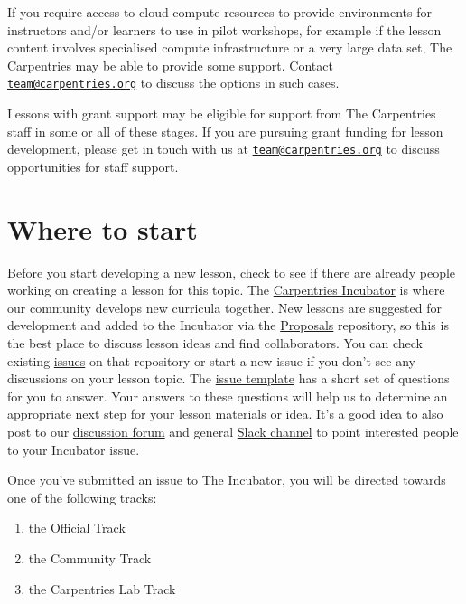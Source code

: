 \documentclass[
]{book}
\providecommand{\tightlist}{%
  \setlength{\itemsep}{0pt}\setlength{\parskip}{0pt}}
\begin{document}
If you require access to cloud compute resources to provide
environments for instructors and/or learners to use in pilot workshops,
for example if the lesson content involves specialised compute infrastructure
or a very large data set,
The Carpentries may be able to provide some support.
Contact \href{mailto:team@carpentries.org}{\nolinkurl{team@carpentries.org}} to discuss the options in such cases.

Lessons with grant support may be eligible for
support from The Carpentries staff in some or all of
these stages. If you are pursuing grant funding for
lesson development, please get in touch with us at
\href{mailto:team@carpentries.org}{\nolinkurl{team@carpentries.org}} to discuss opportunities for staff
support.

\hypertarget{where-to-start}{%
\section{Where to start}\label{where-to-start}}

Before you start developing a new lesson, check
to see if there are already people working on creating
a lesson for this topic.
The \href{https://github.com/carpentries-incubator/}{Carpentries Incubator} is where our community
develops new curricula together.
New lessons are suggested for development and added to the Incubator via the \href{https://github.com/carpentries-incubator/proposals/}{Proposals} repository,
so this is the best place to discuss lesson ideas and find collaborators.
You can check existing \href{https://github.com/carpentries-incubator/proposals/issues}{issues} on that repository
or start a new issue if you don't see any discussions
on your lesson topic. The \href{https://github.com/carpentries-incubator/proposals/blob/master/ISSUE_TEMPLATE.md}{issue template} has
a short set of questions for you to answer. Your answers
to these questions will help us to determine an
appropriate next step for your lesson materials or
idea. It's a good idea to also post to our
\href{https://carpentries.topicbox.com/groups/discuss}{discussion forum} and general \href{https://slack-invite.carpentries.org/}{Slack channel} to point interested people to your
Incubator issue.

Once you've submitted an issue to The Incubator,
you will be directed towards one of the following
tracks:

\begin{enumerate}
\def\labelenumi{\arabic{enumi}.}
\tightlist
\item
  the Official Track
\item
  the Community Track
\item
  the Carpentries Lab Track
\end{enumerate}
\end{document}

